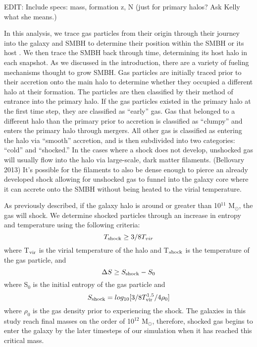 \documentclass[12pt,headA,chapB]{fiskthesis}
\begin{document}
EDIT: Include specs: mass, formation z, N (just for primary halos? Ask Kelly what she means.)

In this analysis, we trace gas particles from their origin through their journey into the galaxy and SMBH to determine their position within the SMBH or its host \citep{Brooks2009} . We then trace the SMBH back through time, determining its host halo in each snapshot. As we discussed in the introduction, there are a variety of fueling mechanisms thought to grow SMBH. Gas particles are initially traced prior to their accretion onto the main halo to determine whether they occupied a different halo at their formation. The particles are then classified by their method of entrance into the primary halo. If the gas particles existed in the primary halo at the first time step, they are classified as ``early'' gas. Gas that belonged to a different halo than the primary prior to accretion is classified as ``clumpy'' and enters the primary halo through mergers. All other gas is classified as entering the halo via ``smooth'' accretion, and is then subdivided into two categories: ``cold'' and ``shocked.'' In the cases where a shock does not develop, unshocked gas will usually flow into the halo via large-scale, dark matter filaments. (Bellovary 2013) It's possible for the filaments to also be dense enough to pierce an already developed shock allowing for unshocked gas to funnel into the galaxy core where it can accrete onto the SMBH without being heated to the virial temperature.

As previously described, if the galaxy halo is around or greater than 10$^{11}$ M$_{\odot} $, the gas will shock. We determine shocked particles through an increase in entropy and temperature using the following criteria:
\begin{equation}
T_{\rm shock} \geq 3/8 T_{vir}
\end{equation}
where T$_{\rm vir}$ is the virial temperature of the halo and T$_{\rm shock}$ is the temperature of the gas particle, and 
\begin{equation}
\Delta S \geq S_{\rm shock} - S_0
\end{equation}
where S$_0$ is the initial entropy of the gas particle and 
\begin{equation}
S_{\rm shock} = log_{10}[3/8 T_{\rm vir}^{1.5}/4 \rho_0]
\end{equation}
where $\rho_0$ is the gas density prior to experiencing the shock. The galaxies in this study reach final masses on the order of 10$^{12}$ M$_{\odot} $, therefore, shocked gas begins to enter the galaxy by the later timesteps of our simulation when it has reached this critical mass. 
\end{document}
